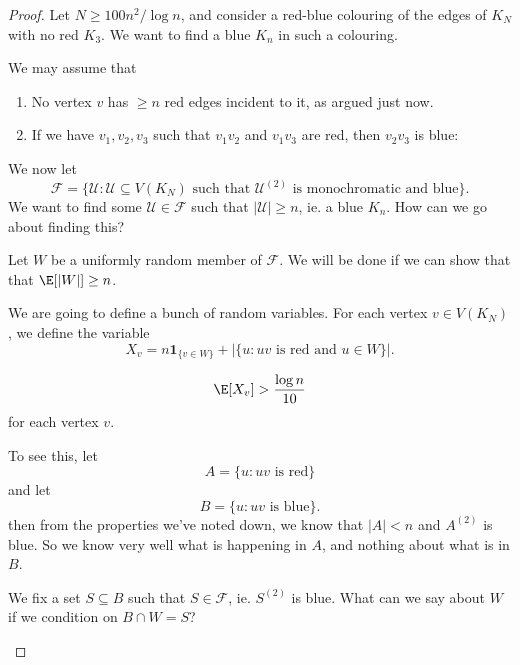 \documentclass[a4paper]{article}
\begin{document}
\begin{proof}
  Let $N \geq 100n^2/\log n$, and consider a red-blue colouring of the edges of $K_N$ with no red $K_3$. We want to find a blue $K_n$ in such a colouring.

  We may assume that
  \begin{enumerate}
    \item No vertex $v$ has $ \geq n$ red edges incident to it, as argued just now.
    \item If we have $v_1, v_2, v_3$ such that $v_1v_2$ and $v_1 v_3$ are red, then $v_2 v_3$ is blue:
      \begin{center}
      \end{center}
  \end{enumerate}
  We now let
  \[
    \mathcal{F} = \{\mathcal{U} : \mathcal{U} \subseteq V(K_N)\text{ such that }\mathcal{U}^{(2)} \text{ is monochromatic and blue}\}.
  \]
  We want to find some $\mathcal{U} \in \mathcal{F}$ such that $|\mathcal{U}| \geq n$, ie. a blue $K_n$. How can we go about finding this?

  Let $W$ be a uniformly random member of $\mathcal{F}$. We will be done if we can show that that $\E[|W|] \geq n$.

  We are going to define a bunch of random variables. For each vertex $v \in V(K_N)$, we define the variable
  \[
    X_v = n \mathbf{1}_{\{v \in W\}} + |\{u: uv\text{ is red and }u \in W\}|.
  \]
  \begin{claim}
   \[
    \E[X_v] > \frac{\log n}{10}
  \]
  for each vertex $v$.
  \end{claim}
  To see this, let
  \[
    A = \{u: uv \text{ is red}\}
  \]
  and let
  \[
    B = \{u: uv \text{ is blue}\}.
  \]
  then from the properties we've noted down, we know that $|A| < n$ and $A^{(2)}$ is blue. So we know very well what is happening in $A$, and nothing about what is in $B$.

  We fix a set $S \subseteq B$ such that $S \in \mathcal{F}$, ie. $S^{(2)}$ is blue. What can we say about $W$ if we condition on $B \cap W = S$?
  \begin{center}
\end{center}
\end{proof}
\end{document}

